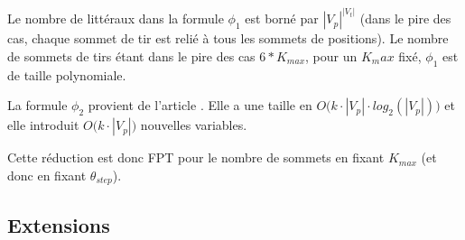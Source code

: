 \vspace{2\baselineskip}

Le nombre de littéraux dans la formule $\phi_1$ est borné par $|V_p| ^{|V_t|}$  (dans le pire des cas, chaque sommet de tir est relié à tous les sommets de positions). Le nombre de sommets de tirs étant dans le pire des cas $6*K_{max}$, pour un $K_max$ fixé, $\phi_1$ est de taille polynomiale. \newline

La formule $\phi_2$ provient de l'article \cite{FG10}. Elle a une taille en $O\Big(k\cdot |V_p| \cdot log_2(|V_p|)\Big)$ et elle introduit  $O\Big(k \cdot |V_p| \Big)$ nouvelles variables.

Cette réduction est donc FPT pour le nombre de sommets en fixant $K_{max}$ (et donc en fixant $\theta_{step}$).


\subsection{Extensions}